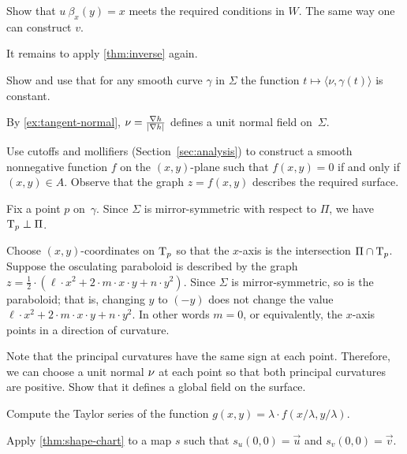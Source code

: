 \begin{multicols}{2}
Show that $u\:\beta_x(y)= x$ meets the required conditions in $W$.
The same way one can construct $v$.

It remains to apply \ref{thm:inverse} again.

Show and use that for any smooth curve $\gamma$ in $\Sigma$ the function $t\mapsto \langle\nu,\gamma(t)\rangle$ is constant.

By \ref{ex:tangent-normal}, $\nu=\tfrac{\nabla h}{|\nabla h|}$ defines a unit normal field on~$\Sigma$.

Use cutoffs and mollifiers (Section~\ref{sec:analysis}) to construct a smooth nonnegative function $f$ on the $(x,y)$-plane such that $f(x,y)=0$ if and only if $(x,y)\in A$.
Observe that the graph $z=f(x,y)$ describes the required surface.


\setcounter{eqtn}{0}

Fix a point $p$ on~$\gamma$.
Since $\Sigma$ is mirror-symmetric with respect to $\Pi$,
we have $\mathrm{T}_p\perp \Pi$.

Choose $(x,y)$-coordinates on $\mathrm{T}_p$ so that the $x$-axis is the intersection $\Pi\cap \mathrm{T}_p$.
Suppose the osculating paraboloid is described by the graph 
$z=\tfrac12\cdot(\ell\cdot x^2+2\cdot m\cdot x\cdot y+n\cdot y^2)$.
Since $\Sigma$ is mirror-symmetric, so is the paraboloid;
that is, changing $y$ to $(-y)$ does not change the value 
$\ell\cdot x^2+2\cdot m\cdot x\cdot y+n\cdot y^2$.
In other words $m=0$, or equivalently, the $x$-axis points in a direction of curvature.

 Note that the principal curvatures have the same sign at each point.
Therefore, we can choose a unit normal $\nu$ at each point so that both principal curvatures are positive.
Show that it defines a global field on the surface.


 Compute the Taylor series of the function $g(x,y)= \lambda \cdot f( x/ \lambda , y/\lambda)$.


Apply \ref{thm:shape-chart} to a map $s$ such that $s_u(0,0)=\vec u$ and $s_v(0,0)=\vec v$.


\end{multicols}
